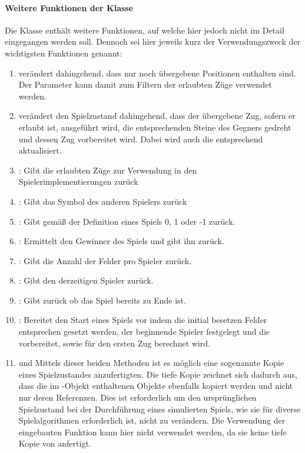 \paragraph{Weitere Funktionen der Klasse }
Die Klasse  enthält weitere Funktionen, auf welche hier jedoch nicht im Detail eingegangen werden soll. Dennoch sei hier jeweils kurz der Verwendungszweck der wichtigsten Funktionen genannt:
\begin{enumerate}
\item {} verändert  dahingehend, dass nur noch übergebene Positionen enthalten sind. Der Parameter kann damit zum Filtern der erlaubten Züge verwendet werden.
\item {} verändert den Spielzustand dahingehend, dass der übergebene Zug, sofern er erlaubt ist, ausgeführt wird, die entsprechenden Steine des Gegners gedreht und dessen Zug vorbereitet wird. Dabei wird auch die  entsprechend aktualisiert.
\item {}: Gibt die erlaubten Züge zur Verwendung in den \\Spielerimplementierungen zurück
\item {}: Gibt das Symbol des anderen Spielers zurück
\item {}: Gibt gemäß der Definition eines Spiels 0, 1 oder -1 zurück.
\item {}: Ermittelt den Gewinner des Spiels und gibt ihn zurück.
\item {}: Gibt die Anzahl der Felder pro Spieler zurück.
\item {}: Gibt den derzeitigen Spieler zurück.
\item {}: Gibt zurück ob das Spiel bereits zu Ende ist.
\item {}: Bereitet den Start eines Spiels vor indem die initial besetzen Felder entsprechen gesetzt werden, der beginnende Spieler festgelegt und die   vorbereitet, sowie  für den ersten Zug berechnet wird.
\item {} und  Mittels dieser beiden Methoden ist es möglich eine sogenannte  Kopie eines Spielzustandes anzufertigten. Die tiefe Kopie zeichnet sich dadurch aus, dass die im -Objekt enthaltenen Objekte ebenfalls kopiert werden und nicht nur deren Referenzen. Dies ist erforderlich um den ursprünglichen Spielzustand bei der Durchführung eines simulierten Spiels, wie sie für diverse Spielalgorithmen erforderlich ist, nicht zu verändern. Die Verwendung der eingebauten Funktion  kann hier nicht verwendet werden, da sie keine tiefe Kopie von  anfertigt.

\end{enumerate}

